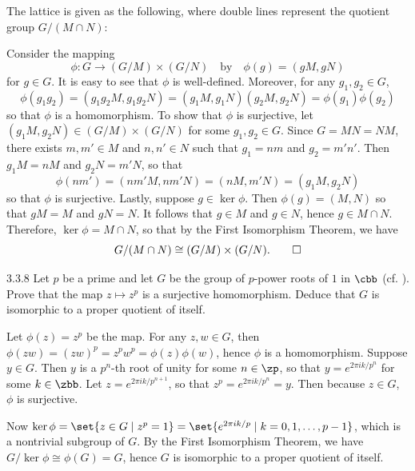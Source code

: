 \begin{sol}
    The lattice is given as the following, where double lines represent the quotient group $G/(M \cap N)$:
    \begin{center}
    \end{center}
    Consider the mapping
    \[
    	\phi : G \to (G/M) \times (G/N) \quad \text{by} \quad \phi(g) = (gM, gN)
    \]
    for $g \in G$.
	It is easy to see that $\phi$ is well-defined.
	Moreover, for any $g_1, g_2 \in G$,
    \[
    	\phi(g_1g_2) = (g_1g_2M, g_1g_2N) = (g_1M, g_1N)(g_2M, g_2N) = \phi(g_1)\phi(g_2)
    \]
    so that $\phi$ is a homomorphism.
	To show that $\phi$ is surjective, let $(g_1M, g_2N) \in (G/M) \times (G/N)$ for some $g_1, g_2 \in G$.
	Since $G = MN = NM$, there exists $m, m' \in M$ and $n, n' \in N$ such that $g_1 = nm$ and $g_2 = m'n'$.
	Then $g_1M = nM$ and $g_2N = m'N$, so that
    \[
    	\phi(nm') = (nm'M, nm'N) = (nM, m'N) = (g_1M, g_2N)
    \]
    so that $\phi$ is surjective.
	Lastly, suppose $g \in \ker\phi$.
	Then $\phi(g) = (M, N)$ so that $gM = M$ and $gN = N$.
	It follows that $g \in M$ and $g \in N$, hence $g \in M \cap N$.
	Therefore, $\ker\phi = M \cap N$, so that by the First Isomorphism Theorem, we have
    \[
    	G/(M \cap N) \cong (G/M) \times (G/N). \qedhere
    \]
\end{sol}

\begin{exercise}{3.3.8}
    Let $p$ be a prime and let $G$ be the group of $p$-power roots of $1$ in $\cbb$ (cf. ).
	Prove that the map $z \mapsto z^p$ is a surjective homomorphism.
	Deduce that $G$ is isomorphic to a proper quotient of itself.
\end{exercise}

\begin{sol}
    Let $\phi(z) = z^p$ be the map.
	For any $z, w \in G$, then $\phi(zw) = (zw)^p = z^p w^p = \phi(z)\phi(w)$, hence $\phi$ is a homomorphism.
	Suppose $y \in G$.
    Then $y$ is a $p^n$-th root of unity for some $n \in \zp$, so that $y = e^{2\pi i k/p^n}$ for some $k \in \zbb$.
	Let $z = e^{2\pi i k/p^{n+1}}$, so that $z^p = e^{2\pi i k/p^n} = y$. Then because $z \in G$, $\phi$ is surjective.

    Now $\ker\phi = \set{z \in G \mid z^p = 1} = \set{e^{2\pi i k/p} \mid k = 0, 1, \ldots, p - 1}$, which is a nontrivial subgroup of $G$.
    By the First Isomorphism Theorem, we have $G/\ker\phi \cong \phi(G) = G$, hence $G$ is isomorphic to a proper quotient of itself.
\end{sol}

